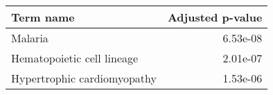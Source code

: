 \begin{tabular}{lr}
\toprule
                  Term name &  Adjusted p-value \\
\midrule
                    Malaria &          6.53e-08 \\
 Hematopoietic cell lineage &          2.01e-07 \\
Hypertrophic cardiomyopathy &          1.53e-06 \\
\bottomrule
\end{tabular}
